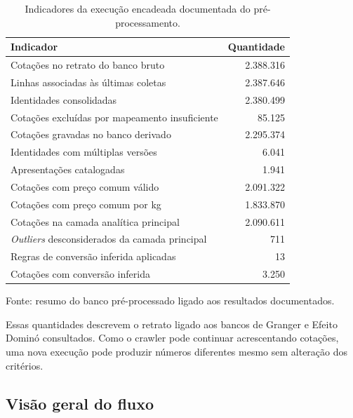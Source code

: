 \documentclass[12pt,a4paper]{article}
\begin{document}
\begin{table}[htbp]
    \centering
    \caption{Indicadores da execução encadeada documentada do pré-processamento.}
    \label{tab:diagnostico}
    \small
    \begin{tabular}{lr}
        \toprule
        \textbf{Indicador} & \textbf{Quantidade} \\
        \midrule
        Cotações no retrato do banco bruto & 2.388.316 \\
        Linhas associadas às últimas coletas & 2.387.646 \\
        Identidades consolidadas & 2.380.499 \\
        Cotações excluídas por mapeamento insuficiente & 85.125 \\
        Cotações gravadas no banco derivado & 2.295.374 \\
        Identidades com múltiplas versões & 6.041 \\
        Apresentações catalogadas & 1.941 \\
        Cotações com preço comum válido & 2.091.322 \\
        Cotações com preço comum por kg & 1.833.870 \\
        Cotações na camada analítica principal & 2.090.611 \\
        \textit{Outliers} desconsiderados da camada principal & 711 \\
        Regras de conversão inferida aplicadas & 13 \\
        Cotações com conversão inferida & 3.250 \\
        \bottomrule
    \end{tabular}

    \par\smallskip
    \footnotesize
    Fonte: resumo do banco pré-processado ligado aos resultados documentados.
\end{table}

Essas quantidades descrevem o retrato ligado aos bancos de Granger e Efeito
Dominó consultados. Como o crawler pode continuar acrescentando cotações, uma
nova execução pode produzir números diferentes mesmo sem alteração dos
critérios.


\subsection{Visão geral do fluxo}
\end{document}
